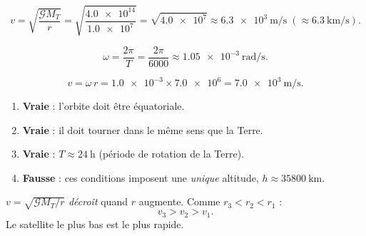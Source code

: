 \documentclass[11pt,a4paper]{article}
\begin{document}

\begin{corrige}
\[
v=\sqrt{\frac{\mathcal{G}M_T}{r}}=\sqrt{\frac{\num{4.0e14}}{\num{1.0e7}}}
 =\sqrt{\num{4.0e7}}\approx\qty{6.3e3}{\metre\per\second}\;(\approx\qty{6.3}{\kilo\metre\per\second}).
\]
\end{corrige}

\begin{corrige}
\[
\omega=\frac{2\pi}{T}=\frac{2\pi}{6000}\approx\qty{1.05e-3}{\radian\per\second}.
\]
\end{corrige}

\begin{corrige}
\[
v=\omega\,r=\num{1.0e-3}\times\num{7.0e6}=\qty{7.0e3}{\metre\per\second}.
\]
\end{corrige}

\begin{corrige}
\begin{enumerate}[label=\alph*)]
  \item \textbf{Vraie} : l'orbite doit être équatoriale.
  \item \textbf{Vraie} : il doit tourner dans le même sens que la Terre.
  \item \textbf{Vraie} : $T\approx\qty{24}{\hour}$ (période de rotation de la Terre).
  \item \textbf{Fausse} : ces conditions imposent une \emph{unique} altitude,
        $h\approx\qty{35800}{\kilo\metre}$.
\end{enumerate}
\end{corrige}

\begin{corrige}
$v=\sqrt{\mathcal{G}M_T/r}$ \emph{décroît} quand $r$ augmente. Comme $r_3<r_2<r_1$ :
\[
\boxed{v_3>v_2>v_1}.
\]
Le satellite le plus bas est le plus rapide.
\end{corrige}
\end{document}
